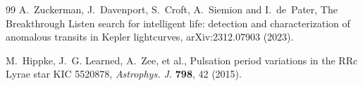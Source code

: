 \documentclass[3p,11pt]{elsarticle}
\begin{document}
\begin{thebibliography}{99}
A.~Zuckerman, J.~Davenport, S.~Croft, A.~Siemion and I.~de~Pater, The Breakthrough
Listen search for intelligent life: detection and characterization of anomalous
transits in Kepler lightcurves, arXiv:2312.07903 (2023).

M.~Hippke, J.~G. Learned, A.~Zee, et al., Pulsation period variations in the RRc Lyrae
star KIC 5520878, \emph{Astrophys. J.} \textbf{798}, 42 (2015).

\end{thebibliography}
\end{document}

